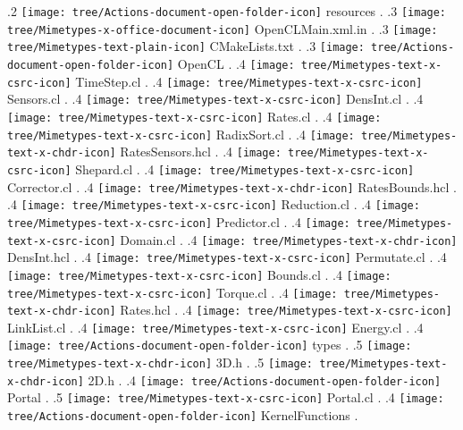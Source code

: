 {.2 { \texttt{[image: tree/Actions-document-open-folder-icon]} resources }.
.3 { \texttt{[image: tree/Mimetypes-x-office-document-icon]} OpenCLMain.xml.in }.
.3 { \texttt{[image: tree/Mimetypes-text-plain-icon]} CMakeLists.txt }.
.3 { \texttt{[image: tree/Actions-document-open-folder-icon]} OpenCL }.
.4 { \texttt{[image: tree/Mimetypes-text-x-csrc-icon]} TimeStep.cl }.
.4 { \texttt{[image: tree/Mimetypes-text-x-csrc-icon]} Sensors.cl }.
.4 { \texttt{[image: tree/Mimetypes-text-x-csrc-icon]} DensInt.cl }.
.4 { \texttt{[image: tree/Mimetypes-text-x-csrc-icon]} Rates.cl }.
.4 { \texttt{[image: tree/Mimetypes-text-x-csrc-icon]} RadixSort.cl }.
.4 { \texttt{[image: tree/Mimetypes-text-x-chdr-icon]} RatesSensors.hcl }.
.4 { \texttt{[image: tree/Mimetypes-text-x-csrc-icon]} Shepard.cl }.
.4 { \texttt{[image: tree/Mimetypes-text-x-csrc-icon]} Corrector.cl }.
.4 { \texttt{[image: tree/Mimetypes-text-x-chdr-icon]} RatesBounds.hcl }.
.4 { \texttt{[image: tree/Mimetypes-text-x-csrc-icon]} Reduction.cl }.
.4 { \texttt{[image: tree/Mimetypes-text-x-csrc-icon]} Predictor.cl }.
.4 { \texttt{[image: tree/Mimetypes-text-x-csrc-icon]} Domain.cl }.
.4 { \texttt{[image: tree/Mimetypes-text-x-chdr-icon]} DensInt.hcl }.
.4 { \texttt{[image: tree/Mimetypes-text-x-csrc-icon]} Permutate.cl }.
.4 { \texttt{[image: tree/Mimetypes-text-x-csrc-icon]} Bounds.cl }.
.4 { \texttt{[image: tree/Mimetypes-text-x-csrc-icon]} Torque.cl }.
.4 { \texttt{[image: tree/Mimetypes-text-x-chdr-icon]} Rates.hcl }.
.4 { \texttt{[image: tree/Mimetypes-text-x-csrc-icon]} LinkList.cl }.
.4 { \texttt{[image: tree/Mimetypes-text-x-csrc-icon]} Energy.cl }.
.4 { \texttt{[image: tree/Actions-document-open-folder-icon]} types }.
.5 { \texttt{[image: tree/Mimetypes-text-x-chdr-icon]} 3D.h }.
.5 { \texttt{[image: tree/Mimetypes-text-x-chdr-icon]} 2D.h }.
.4 { \texttt{[image: tree/Actions-document-open-folder-icon]} Portal }.
.5 { \texttt{[image: tree/Mimetypes-text-x-csrc-icon]} Portal.cl }.
.4 { \texttt{[image: tree/Actions-document-open-folder-icon]} KernelFunctions }.
}

